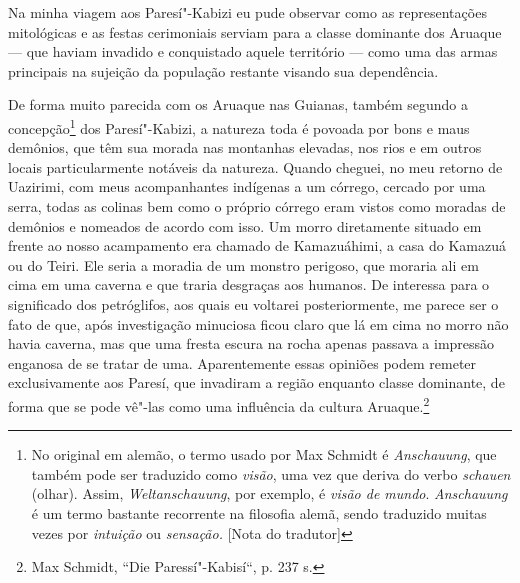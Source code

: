 Na minha viagem aos Paresí"-Kabizi eu pude observar como as
representações mitológicas e as festas cerimoniais serviam para a
classe dominante dos Aruaque --- que haviam invadido e conquistado
aquele território --- como uma das armas principais na sujeição da
população restante visando sua dependência.

De forma muito parecida com os Aruaque nas Guianas, também segundo a
concepção\footnote[*]{No original em alemão, o termo usado por Max
  Schmidt é \emph{Anschauung}, que também pode ser traduzido como
  \emph{visão}, uma vez que deriva do verbo \emph{schauen} (olhar).
  Assim, \emph{Weltanschauung}, por exemplo, é \emph{visão de mundo}.
  \emph{Anschauung} é um termo bastante recorrente na filosofia alemã,
  sendo traduzido muitas vezes por \emph{intuição} ou \emph{sensação.}
  {[}Nota do tradutor{]}} dos Paresí"-Kabizi, a natureza toda é povoada por bons e maus
demônios, que têm sua morada nas montanhas elevadas, nos rios e em
outros locais particularmente notáveis da natureza. Quando cheguei, no
meu retorno de Uazirimi, com meus acompanhantes indígenas a um córrego,
cercado por uma serra, todas as colinas bem como o próprio córrego eram
vistos como moradas de demônios e nomeados de acordo com isso. Um morro
diretamente situado em frente ao nosso acampamento era chamado de
Kamazuáhimi, a casa do Kamazuá ou do Teiri. Ele seria a moradia de um
monstro perigoso, que moraria ali em cima em uma caverna e que traria
desgraças aos humanos. De interessa para o significado dos petróglifos,
aos quais eu voltarei posteriormente, me parece ser o fato de que, após
investigação minuciosa ficou claro que lá em cima no morro não havia
caverna, mas que uma fresta escura na rocha apenas passava a impressão
enganosa de se tratar de uma. Aparentemente essas opiniões podem
remeter exclusivamente aos Paresí, que invadiram a região enquanto
classe dominante, de forma que se pode vê"-las como uma influência da
cultura Aruaque.\footnote{Max Schmidt, ``Die Paressí"-Kabisí``, p. 237 s.}


